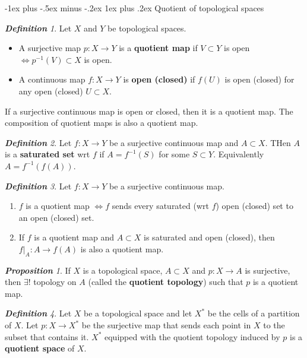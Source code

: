 \documentclass[frenchspacing,9pt,landscape,a4paper]{article}
\makeatletter
\renewcommand{\subsubsection}{\@startsection{subsubsection}{3}{0mm}%
                                {-1ex plus -.5ex minus -.2ex}%
                                {1ex plus .2ex}%
                                {\normalfont\small\bfseries}}
\theoremstyle{remark}
\newtheorem*{defn}{\textbf{Definition}}
\newtheorem*{prop}{\textbf{Proposition}}
\makeatother
\begin{document}
\begin{multicols}{4}
\subsubsection{Quotient of topological spaces}
\begin{defn}
    Let $X$ and  $Y$ be topological spaces.
     \begin{itemize}
         \item A surjective map $p:X\to Y$ is a \textbf{quotient map} if  $V\subset Y$ is open  $\iff
             p^{-1}(V)\subset X$ is open.
         \item A continuous map  $f:X\to Y$ is \textbf{open (closed)} if  $f(U)$ is open (closed) for any open
             (closed)  $U\subset X$.
    \end{itemize} If a surjective continuous map is open or closed, then it is a quotient map. The
    composition of quotient maps is also a quotient map.
\end{defn}
\begin{defn}
    Let $f:X\to Y$ be a surjective continuous map and  $A\subset X$. THen  $A$ is a \textbf{saturated set}
    wrt  $f$ if  $A=f^{-1}(S)$ for some  $S\subset Y$. Equivalently  $A=f^{-1}(f(A))$.
\end{defn}
\begin{defn}
    Let $f:X\to Y$ be a surjective continuous map.
     \begin{enumerate}
         \item $f$ is a quotient map  $\iff f$ sends every saturated (wrt $f$) open (closed) set to an open
             (closed) set.
         \item If $f$ is a quotient map and  $A\subset X$ is saturated and open (closed), then
             $f|_A:A\to f(A)$ is also a quotient map.
    \end{enumerate}
\end{defn}
\begin{prop}
    If $X$ is a topological space,  $A\subset X$ and  $p:X\to A$ is surjective, then  $\exists!$ topology
    on  $A$ (called the \textbf{quotient topology}) such that  $p$ is a quotient map.
\end{prop}
\begin{defn}
    Let $X$ be a topological space and let  $X^*$ be the cells of a partition of  $X$. Let  $p:X\to X^*$ be
    the surjective map that sends each point in  $X$ to the subset that contains it.  $X^*$ equipped
    with the quotient topology induced by  $p$ is a \textbf{quotient space} of $X$.
\end{defn}

\end{multicols}
\end{document}
